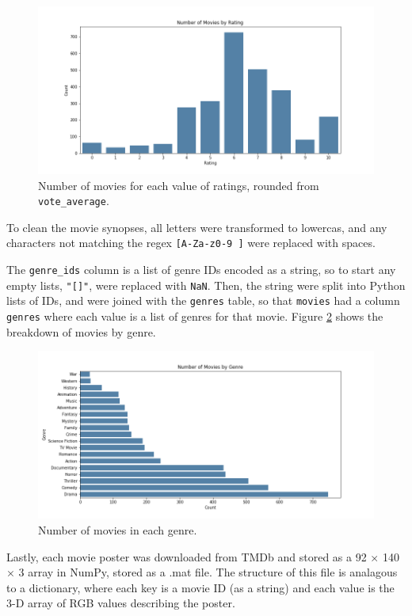 \documentclass[12pt, oneside]{article}   	%
\begin{document}
\begin{figure}%
\includegraphics[width=\textwidth]{rating_barplot}
\caption{\label{fig:rating_barplot}Number of movies for each value of ratings, rounded from \texttt{vote\_average}.}
\end{figure}

To clean the movie synopses, all letters were transformed to lowercas, and any characters not matching the regex \texttt{[A-Za-z0-9 ]} were replaced with spaces.

The \texttt{genre\_ids} column is a list of genre IDs encoded as a string, so to start any empty lists, \texttt{"[]"}, were replaced with \texttt{NaN}. Then, the string were split into Python lists of IDs, and were joined with the \texttt{genres} table, so that \texttt{movies} had a column \texttt{genres} where each value is a list of genres for that movie. Figure \ref{fig:genre_barplot} shows the breakdown of movies by genre.

\begin{figure}%
\includegraphics[width=\textwidth]{genre_barplot}
\caption{\label{fig:genre_barplot}Number of movies in each genre.}
\end{figure}

Lastly, each movie poster was downloaded from TMDb and stored as a 92 $\times$ 140 $\times$ 3 array in NumPy, stored as a .mat file. The structure of this file is analagous to a dictionary, where each key is a movie ID (as a string) and each value is the 3-D array of RGB values describing the poster.
\end{document}
